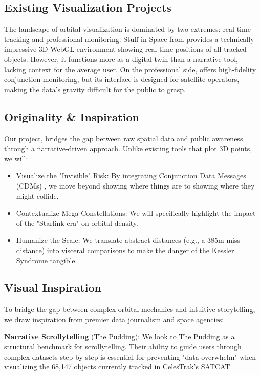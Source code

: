 \subsection{Existing Visualization Projects}

The landscape of orbital visualization is dominated by two extremes: real-time tracking and professional monitoring. Stuff in Space from \cite{stuff-in-space} provides a technically impressive 3D WebGL environment showing real-time positions of all tracked objects. However, it functions more as a digital twin than a narrative tool, lacking context for the average user. On the professional side, \cite{leolabs} offers high-fidelity conjunction monitoring, but its interface is designed for satellite operators, making the data's gravity difficult for the public to grasp.

\subsection{Originality \& Inspiration}
Our project, bridges the gap between raw spatial data and public awareness through a narrative-driven approach. Unlike existing tools that plot 3D points, we will:
\begin{itemize}
    \item Visualize the "Invisible" Risk: By integrating Conjunction Data Messages (CDMs) , we move beyond showing where things are to showing where they might collide.
    \item Contextualize Mega-Constellations: We will specifically highlight the impact of the "Starlink era" on orbital density.
    \item Humanize the Scale: We translate abstract distances (e.g., a 385m miss distance) into visceral comparisons to make the danger of the Kessler Syndrome tangible.
\end{itemize}

\subsection{Visual Inspiration}

To bridge the gap between complex orbital mechanics and intuitive storytelling, we draw inspiration from premier data journalism and space agencies:

\textbf{Narrative Scrollytelling} (The Pudding): We look to The Pudding as a structural benchmark for scrollytelling. Their ability to guide users through complex datasets step-by-step is essential for preventing "data overwhelm" when visualizing the 68,147 objects currently tracked in CelesTrak's SATCAT.
    
